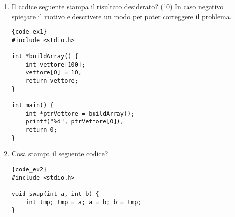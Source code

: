 \begin{center}
\end{center}


\begin{enumerate}

\vspace{.5cm}
\item 
     Il codice seguente stampa il risultato desiderato? (10) In caso negativo spiegare il motivo e descrivere un modo per poter correggere il problema.

    \begin{minipage}
    {.40\textwidth}
        \begin{lstlisting}{code_ex1}
#include <stdio.h> 

int *buildArray() { 
	int vettore[100]; 
	vettore[0] = 10; 
	return vettore; 
} 

int main() {
	int *ptrVettore = buildArray(); 
	printf("%d", ptrVettore[0]); 
	return 0; 
} 
        \end{lstlisting}
    \end{minipage}\hfill
\begin{minipage}[t]
    {.55\textwidth}
\end{minipage}


\vspace{1.5cm}
\item {} Cosa stampa il seguente codice?

\begin{minipage}{.40\textwidth}
    \begin{lstlisting}{code_ex2}
#include <stdio.h>

void swap(int a, int b) {
    int tmp; tmp = a; a = b; b = tmp;
}


\end{lstlisting}
\end{minipage}
\end{enumerate}
